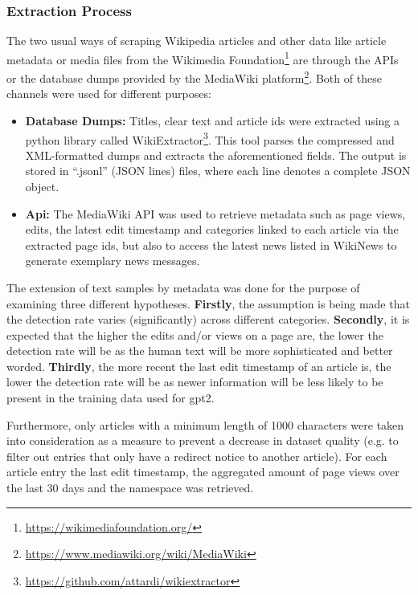 \subsubsection{Extraction Process}
\label{sub:extraction_process}

The two usual ways of scraping Wikipedia articles and other data like article metadata or media files from the Wikimedia Foundation\footnote{\url{https://wikimediafoundation.org/}} are through the APIs or the database dumps provided by the MediaWiki platform\footnote{\url{https://www.mediawiki.org/wiki/MediaWiki}}.
Both of these channels were used for different purposes:\\
\begin{itemize}
    \item{\textbf{Database Dumps:}} Titles, clear text and article ids were extracted using a python library called WikiExtractor\footnote{\url{https://github.com/attardi/wikiextractor}}. This tool parses the compressed and XML-formatted dumps and extracts the aforementioned fields. The output is stored in “.jsonl” (JSON lines) files, where each line denotes a complete JSON object.
    \item{\textbf{Api:}} The MediaWiki API was used to retrieve metadata such as page views, edits, the latest edit timestamp and categories linked to each article via the extracted page ids, but also to access the latest news listed in WikiNews to generate exemplary news messages.
\end{itemize}

The extension of text samples by metadata was done for the purpose of examining three different hypotheses. \textbf{Firstly}, the assumption is being made that the detection rate varies (significantly) across different categories. \textbf{Secondly}, it is expected that the higher the edits and/or views on a page are, the lower the detection rate will be as the human text will be more sophisticated and better worded. \textbf{Thirdly}, the more recent the last edit timestamp of an article is, the lower the detection rate will be as newer information will be less likely to be present in the training data used for \gls{gpt2}.

Furthermore, only articles with a minimum length of 1000 characters were taken into consideration as a measure to prevent a decrease in dataset quality (e.g. to filter out entries that only have a redirect notice to another article). For each article entry the last edit timestamp, the aggregated amount of page views over the last 30 days and the namespace was retrieved.
